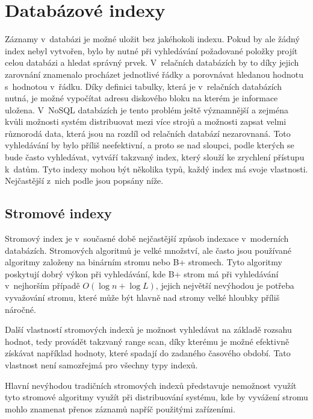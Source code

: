 \section{Databázové indexy}
Záznamy v~databázi je možné uložit bez jakéhokoli indexu. Pokud by ale žádný index nebyl vytvořen, bylo by nutné při vyhledávání požadované položky projít celou databázi a hledat správný prvek. V~relačních databázích by to díky jejich zarovnání znamenalo procházet jednotlivé řádky a porovnávat hledanou hodnotu s~hodnotou v~řádku. Díky definici tabulky, která je v~relačních databázích nutná, je možné vypočítat adresu diskového bloku na kterém je informace uložena. V~NoSQL databázích je tento problém ještě významnější a zejména kvůli možnosti systém distribuovat mezi více strojů a možnosti zapsat velmi různorodá data, která jsou na rozdíl od relačních databází nezarovnaná. Toto vyhledávání by bylo příliš neefektivní, a proto se nad sloupci, podle kterých se bude často vyhledávat, vytváří takzvaný index, který slouží ke zrychlení přístupu k~datům. Tyto indexy mohou být několika typů, každý index má svoje vlastnosti. Nejčastější z~nich podle \cite{stopford_2015} jsou popsány níže.
\subsection{Stromové indexy}
Stromový index je v~současné době nejčastější \cite{jaluta2003recoverable} způsob indexace v~moderních databázích. Stromových algoritmů je velké množství, ale často jsou používané algoritmy založeny na binárním stromu nebo B+ stromech. Tyto algoritmy poskytují dobrý výkon při vyhledávání, kde B+ strom má při vyhledávání v~nejhorším případě $O(\log n + \log L)$, jejich největší nevýhodou je potřeba vyvažování stromu, které může být hlavně nad stromy velké hloubky příliš náročné.

Další vlastností stromových indexů je možnost vyhledávat na základě rozsahu hodnot, tedy provádět takzvaný range scan, díky kterému je možné efektivně získávat například hodnoty, které spadají do zadaného časového období. Tato vlastnost není samozřejmá pro všechny typy indexů.

Hlavní nevýhodou tradičních stromových indexů představuje nemožnost využít tyto stromové algoritmy využít při distribuování systému, kde by vyvážení stromu mohlo znamenat přenos záznamů napříč použitými zařízeními.
